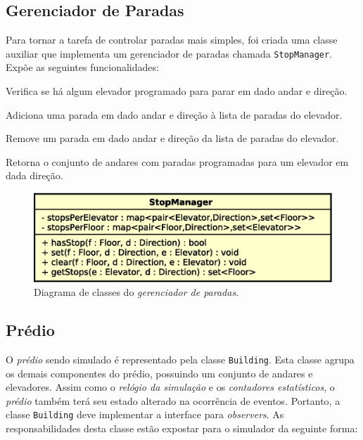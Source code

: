 \subsection{Gerenciador de Paradas}

  Para tornar a tarefa de controlar paradas mais simples, foi criada uma classe
  auxiliar que implementa um gerenciador de paradas chamada
  \texttt{StopManager}. Expõe as seguintes funcionalidades:

  \begin{description}[leftmargin=!,labelwidth=\widthof{\bfseries arrivalFloor}]
    \item[\texttt{hasStop}] Verifica se há algum elevador programado para parar em dado andar e direção.
    \item[\texttt{set}] Adiciona uma parada em dado andar e direção à lista de paradas do elevador.
    \item[\texttt{clear}] Remove um parada em dado andar e direção da lista de paradas do elevador.
    \item[\texttt{getStops}] Retorna o conjunto de andares com paradas programadas para um elevador em dada direção.
  \end{description}

  \begin{figure}[htb!]
    \centering
    \includegraphics[scale=0.6]{img/StopManager}
    \caption{Diagrama de classes do \textit{gerenciador de paradas}.}
  \label{fig:diagram:stopmanager}
  \end{figure}

\subsection{Prédio} \label{model:state:building}

O \textit{prédio} sendo simulado é representado pela classe \texttt{Building}.
Esta classe agrupa os demais componentes do prédio, possuindo um conjunto de
andares e elevadores. Assim como o \textit{relógio da simulação} e os
\textit{contadores estatísticos}, o \textit{prédio} também terá seu estado
alterado na ocorrência de eventos. Portanto, a classe \texttt{Building} deve
implementar a interface para \textit{observers}. As responsabilidades desta
classe estão expostar para o simulador da seguinte forma:


